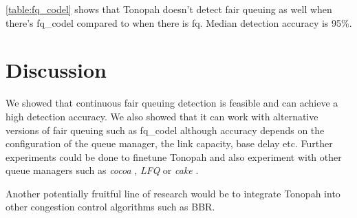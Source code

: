 \documentclass[conference]{IEEEtran}
\begin{document}
\autoref{table:fq_codel} shows that Tonopah doesn't detect fair queuing as well when there's fq\_codel compared to when there is fq. Median detection accuracy is 95\%.

\section{Discussion}

We showed that continuous fair queuing detection is feasible and can achieve a high detection accuracy. 
We also showed that it can work with alternative versions of fair queuing such as fq\_codel although accuracy depends on the configuration of the queue manager, 
the link capacity, base delay etc. Further experiments could be done to finetune Tonopah and also experiment with other queue managers such as \textit{cocoa} \cite{bachl_cocoa_2019}, \textit{LFQ} \cite{bachl_lfq_2020} or \textit{cake} \cite{hoiland-jorgensen_piece_2018}. 

Another potentially fruitful line of research would be to integrate Tonopah into other congestion control algorithms such as BBR. 



\end{document}
